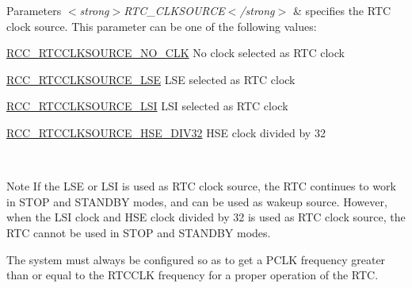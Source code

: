 \begin{DoxyParams}{Parameters}
{\em $<$strong$>$\+R\+T\+C\+\_\+\+C\+L\+K\+S\+O\+U\+R\+C\+E$<$/strong$>$} & specifies the R\+TC clock source. This parameter can be one of the following values\+: \begin{DoxyItemize}
\item \hyperlink{group___r_c_c___r_t_c___clock___source_gacce0b2f54d103340d8c3a218e86e295d}{R\+C\+C\+\_\+\+R\+T\+C\+C\+L\+K\+S\+O\+U\+R\+C\+E\+\_\+\+N\+O\+\_\+\+C\+LK} No clock selected as R\+TC clock \item \hyperlink{group___r_c_c___r_t_c___clock___source_ga5dca8d63f250a20bd6bc005670d0c150}{R\+C\+C\+\_\+\+R\+T\+C\+C\+L\+K\+S\+O\+U\+R\+C\+E\+\_\+\+L\+SE} L\+SE selected as R\+TC clock \item \hyperlink{group___r_c_c___r_t_c___clock___source_gab47a1afb8b5eef9f20f4772961d0a5f4}{R\+C\+C\+\_\+\+R\+T\+C\+C\+L\+K\+S\+O\+U\+R\+C\+E\+\_\+\+L\+SI} L\+SI selected as R\+TC clock \item \hyperlink{group___r_c_c___r_t_c___clock___source_ga070b819c6eca00d4b89cbf35216c3a92}{R\+C\+C\+\_\+\+R\+T\+C\+C\+L\+K\+S\+O\+U\+R\+C\+E\+\_\+\+H\+S\+E\+\_\+\+D\+I\+V32} H\+SE clock divided by 32 \end{DoxyItemize}
\\
\hline
\end{DoxyParams}
\begin{DoxyNote}{Note}
If the L\+SE or L\+SI is used as R\+TC clock source, the R\+TC continues to work in S\+T\+OP and S\+T\+A\+N\+D\+BY modes, and can be used as wakeup source. However, when the L\+SI clock and H\+SE clock divided by 32 is used as R\+TC clock source, the R\+TC cannot be used in S\+T\+OP and S\+T\+A\+N\+D\+BY modes. 

The system must always be configured so as to get a P\+C\+LK frequency greater than or equal to the R\+T\+C\+C\+LK frequency for a proper operation of the R\+TC. 
\end{DoxyNote}
\mbox{\label{group___r_c_c___r_t_c___clock___configuration_gaab5eeb81fc9f0c8d4450069f7a751855}} 
